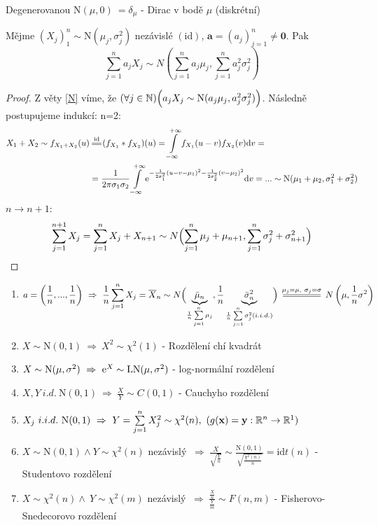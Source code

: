 \begin{remark}
	Degenerovanou $\mathrm{N}(\mu,0)\:=\delta_\mu$ - Dirac v bodě $\mu$ (diskrétní)
\end{remark}
\begin{theorem}[Reprodukce]
	Mějme $(X_j)_1^n\sim \mathrm{N}(\mu_j,\sigma_j^2)$ nezávislé $(\text{id})$, $\textbf{a}=(a_j)_{j=1}^n\neq \textbf{0}$. Pak $$\sum\limits_{j=1}^n a_jX_j\sim N\left( \sum\limits_{j=1}^n a_j\mu_j,\sum\limits_{j=1}^na_j^2\sigma_j^2 \right)$$
	\begin{proof}
		Z věty \ref{N} víme, že $(\forall j\in\mathbb{N})\Bigl(a_jX_j\sim \mathrm{N}(a_j\mu_j,a_j^2\sigma_j^2)\Bigr)$. Následně postupujeme indukcí:\newline 
		n=2: \[
		\begin{split}
		X_1+X_2\sim f_{X_1+X_2}(u)&\equal{\text{id}}(f_{X_1}\ast f_{X_2})(u)=\int\limits_{-\infty}^{+\infty} f_{X_1}(u-v)f_{X_2}(v)\dif v=\\ &=\frac{1}{2\pi\sigma_1\sigma_2}\int\limits_{-\infty}^{+\infty} \me^{-\frac{1}{2\sigma_1^2}(u-v-\mu_1)^2-\frac{1}{2\sigma_2^2}(v-\mu_2)^2}\dif v=...  \sim \mathrm{N}(\mu_1+\mu_2,\sigma_1^2+\sigma_2^2)
		\end{split} \]
		$n\to n+1$: $$ \sum\limits_{j=1}^{n+1}X_j=\sum\limits_{j=1}^n X_j + X_{n+1} \sim N\Bigl(\sum\limits_{j=1}^n \mu_j + \mu_{n+1},\sum\limits_{j=1}^n \sigma_j^2+\sigma_{n+1}^2\Bigr) $$
	\end{proof}
\end{theorem}
\begin{remark}
	\begin{enumerate}
		\item 	$$a=\left( \frac{1}{n},... ,\frac{1}{n} \right)~\Rightarrow~ \frac{1}{n}\sum\limits_{j=1}^n X_j = \overline{X}_n \sim N\Bigl( \underbrace{\bar{\mu}_n}_{\frac{1}{n}\sum\limits_{j=1}^n \mu_j},\frac{1}{n}\underbrace{\bar{\sigma}_n^2}_{\frac{1}{n}\sum\limits_{j=1}^n \sigma_j^2 (i.i.d.)} \Bigr)\equal{
			\mu_j=\mu,~\sigma_j=\sigma }N\left( \mu,\frac{1}{n}\sigma^2 \right)$$
	
\item $X\sim \mathrm{N}(0,1)~\Rightarrow~ X^2\sim \chi^2(1)$ - Rozdělení chí kvadrát
\item $X\sim \mathrm{N}(\mu,\sigma^2)~\Rightarrow~ \mathrm{e}^X \sim \mathrm{LN}(\mu,\sigma^2)$ - log-normální rozdělení
\item $X,Y ~i.d.~\mathrm{N}(0,1)~\Rightarrow~ \frac{X}{Y}\sim C(0,1) $ - Cauchyho rozdělení
\item $ X_j ~i.i.d.~\mathrm{N}(0,1)~\Rightarrow~ Y=\sum\limits_{j=1}^n X_j^2 \sim \chi^2(n),~(g(\textbf{x})=\textbf{y}:\mathbb{R}^n\to\mathbb{R}^1)$
\item $X\sim \mathrm{N}(0,1)\wedge Y\sim \chi^2(n)$ nezávislý $~\Rightarrow~\frac{X}{\sqrt{\frac{Y}{n}}}\sim \frac{\mathrm{N}(0,1)}{\sqrt{\frac{\chi^2(n)}{n}}}\equal{\text{id}}t(n)$ - Studentovo rozdělení
\item $X\sim \chi^2(n) \wedge~Y\sim \chi^2(m)$ nezávislý $~\Rightarrow~ \frac{\frac{X}{n}}{\frac{Y}{m}}\sim F(n,m)$ - Fisherovo-Snedecorovo rozdělení
\end{enumerate}
\end{remark}
